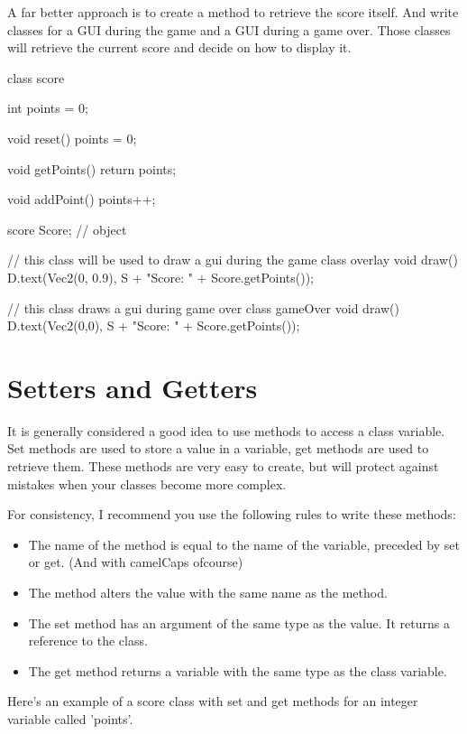 A far better approach is to create a method to retrieve the score itself. And write classes for a GUI during the game and a GUI during a game over. Those classes will retrieve the current score and decide on how to display it.

\begin{code}
class score {
  int points = 0;
  
  void reset() {
    points = 0;
  }
  
  void getPoints() {
    return points;
  }
  
  void addPoint() {
    points++;
  }
}

score Score; // object

// this class will be used to draw a gui during the game
class overlay {
  void draw() {
    D.text(Vec2(0, 0.9), S + "Score: " + Score.getPoints());
  }
}

// this class draws a gui during game over
class gameOver {
  void draw() {
    D.text(Vec2(0,0), S + "Score: " + Score.getPoints());
  } 
}
\end{code}

\section{Setters and Getters}

It is generally considered a good idea to use methods to access a class variable. Set methods are used to store a value in a variable, get methods are used to retrieve them. These methods are very easy to create, but will protect against mistakes when your classes become more complex.

For consistency, I recommend you use the following rules to write these methods:

\begin{itemize}
\item The name of the method is equal to the name of the variable, preceded by set or get. (And with camelCaps ofcourse)
\item The method alters the value with the same name as the method.
\item The set method has an argument of the same type as the value. It returns a reference to the class.
\item The get method returns a variable with the same type as the class variable.
\end{itemize}

Here's an example of a score class with set and get methods for an integer variable called 'points'.

